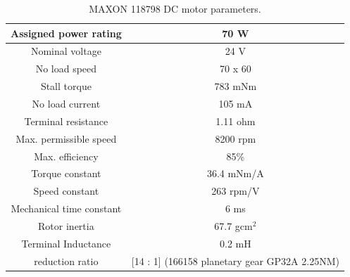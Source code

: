 \begin{table}[h]
	\begin{center}
		\begin{tabular}{|c|c|}
			\hline
			Assigned power rating &  70 W \\
			\hline
			Nominal voltage & 24 V \\
			\hline
			No load speed & 70 x 60  \\
			\hline
			Stall torque & 783 mNm \\
			\hline
			No load current & 105 mA \\ 
			\hline
			Terminal resistance & 1.11 ohm \\
			\hline 
			Max. permissible speed & 8200 rpm \\
			\hline
			Max. efficiency &  85\% \\
			\hline
			Torque constant & 36.4 mNm/A \\
			\hline
			Speed constant & 263 rpm/V \\
			\hline
			Mechanical time constant & 6 ms \\
			\hline 
			Rotor inertia & 67.7 gcm$^2$ \\
			\hline
			Terminal Inductance & 0.2 mH \\
			\hline  
			reduction ratio & [14 : 1] (166158 planetary gear GP32A 2.25NM) \\
			\hline 
		\end{tabular}
	\end{center}
	\caption{MAXON 118798 DC motor parameters.}
    \label{maxon}
\end{table}

